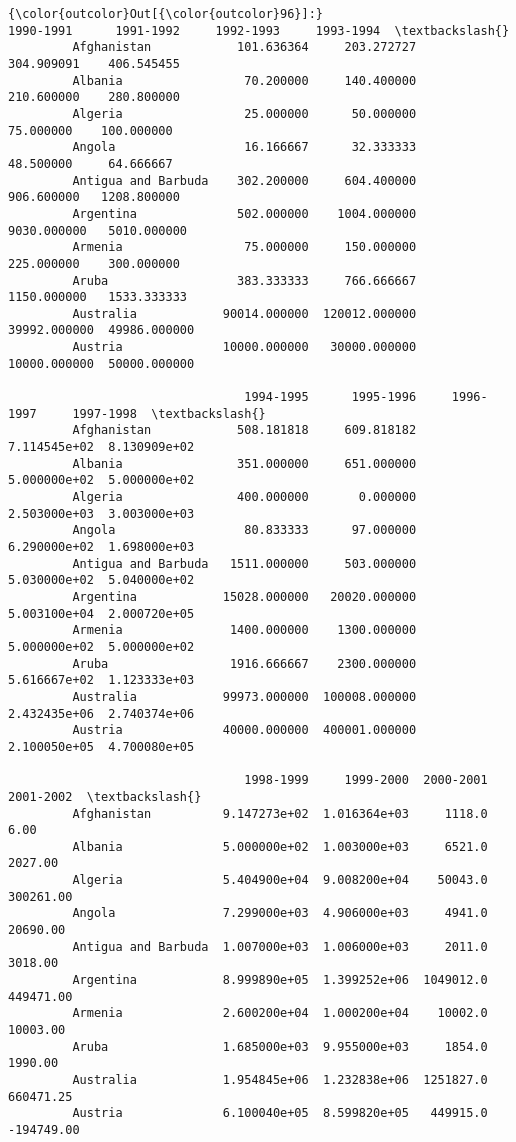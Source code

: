 \documentclass[11pt]{article}
\begin{document}
\begin{Verbatim}[commandchars=\\\{\}]
{\color{outcolor}Out[{\color{outcolor}96}]:}                         1990-1991      1991-1992     1992-1993     1993-1994  \textbackslash{}
         Afghanistan            101.636364     203.272727    304.909091    406.545455   
         Albania                 70.200000     140.400000    210.600000    280.800000   
         Algeria                 25.000000      50.000000     75.000000    100.000000   
         Angola                  16.166667      32.333333     48.500000     64.666667   
         Antigua and Barbuda    302.200000     604.400000    906.600000   1208.800000   
         Argentina              502.000000    1004.000000   9030.000000   5010.000000   
         Armenia                 75.000000     150.000000    225.000000    300.000000   
         Aruba                  383.333333     766.666667   1150.000000   1533.333333   
         Australia            90014.000000  120012.000000  39992.000000  49986.000000   
         Austria              10000.000000   30000.000000  10000.000000  50000.000000   
         
                                 1994-1995      1995-1996     1996-1997     1997-1998  \textbackslash{}
         Afghanistan            508.181818     609.818182  7.114545e+02  8.130909e+02   
         Albania                351.000000     651.000000  5.000000e+02  5.000000e+02   
         Algeria                400.000000       0.000000  2.503000e+03  3.003000e+03   
         Angola                  80.833333      97.000000  6.290000e+02  1.698000e+03   
         Antigua and Barbuda   1511.000000     503.000000  5.030000e+02  5.040000e+02   
         Argentina            15028.000000   20020.000000  5.003100e+04  2.000720e+05   
         Armenia               1400.000000    1300.000000  5.000000e+02  5.000000e+02   
         Aruba                 1916.666667    2300.000000  5.616667e+02  1.123333e+03   
         Australia            99973.000000  100008.000000  2.432435e+06  2.740374e+06   
         Austria              40000.000000  400001.000000  2.100050e+05  4.700080e+05   
         
                                 1998-1999     1999-2000  2000-2001  2001-2002  \textbackslash{}
         Afghanistan          9.147273e+02  1.016364e+03     1118.0       6.00   
         Albania              5.000000e+02  1.003000e+03     6521.0    2027.00   
         Algeria              5.404900e+04  9.008200e+04    50043.0  300261.00   
         Angola               7.299000e+03  4.906000e+03     4941.0   20690.00   
         Antigua and Barbuda  1.007000e+03  1.006000e+03     2011.0    3018.00   
         Argentina            8.999890e+05  1.399252e+06  1049012.0  449471.00   
         Armenia              2.600200e+04  1.000200e+04    10002.0   10003.00   
         Aruba                1.685000e+03  9.955000e+03     1854.0    1990.00   
         Australia            1.954845e+06  1.232838e+06  1251827.0  660471.25   
         Austria              6.100040e+05  8.599820e+05   449915.0 -194749.00   
         

\end{Verbatim}
\end{document}
